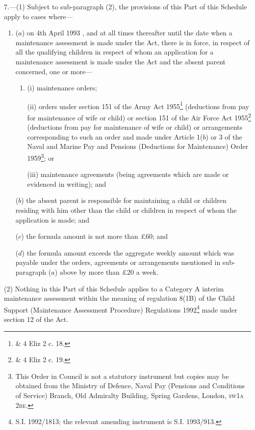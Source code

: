 \documentclass[12pt,a4paper]{article}
\begin{document}
7.—(1) Subject to sub-paragraph (2), the provisions of this Part of this Schedule apply to cases where—
\begin{enumerate}\item[]
($a$) on 4th April 1993%
, and at all times thereafter until the date when a maintenance assessment is made under the Act, %
 there is in force, in respect of all the qualifying children in respect of whom an application for a maintenance assessment is made under the Act and the absent parent concerned, one or more—
\begin{enumerate}\item[]
(i) maintenance orders;

(ii) orders under section 151 of the Army Act 1955\footnote{ \& 4 Eliz 2 c. 18.} (deductions from pay for maintenance of wife or child) or section 151 of the Air Force Act 1955\footnote{ \& 4 Eliz 2 c. 19.} (deductions from pay for maintenance of wife or child) or arrangements corresponding to such an order and made under Article 1($b$) or 3 of the Naval and Marine Pay and Pensions (Deductions for Maintenance) Order 1959\footnote{\frenchspacing This Order in Council is not a statutory instrument but copies may be obtained from the Ministry of Defence, Naval Pay (Pensions and Conditions of Service) Branch, Old Admiralty Building, Spring Gardens, London, \textsc{sw1a 2be}.}; or

(iii) maintenance agreements (being agreements which are made or evidenced in writing); and
\end{enumerate}

($b$) the absent parent is responsible for maintaining a child or children residing with him other than the child or children in respect of whom the application is made; and

($c$) the formula amount is not more than £60; and

($d$) the formula amount exceeds the aggregate weekly amount which was payable under the orders, agreements or arrangements mentioned in sub-paragraph ($a$) above by more than £20 a week.
\end{enumerate}

(2) Nothing in this Part of this Schedule applies to 
a Category A interim maintenance assessment within the meaning of regulation 8(1B) of the Child Support (Maintenance Assessment Procedure) Regulations 1992\footnote{\frenchspacing S.I. 1992/1813; the relevant amending instrument is S.I. 1993/913.} %
made under section 12 of the Act.
\end{document}
